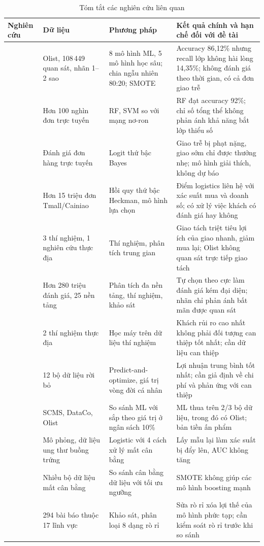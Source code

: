 \documentclass[12pt,a4paper]{report}
\begin{document}
\begin{table}[htbp]\centering\footnotesize
\caption{Tóm tắt các nghiên cứu liên quan}\label{tab:related}
\begin{tabular}{L{2.5cm}L{3.0cm}L{3.4cm}L{5.3cm}}
\toprule
Nghiên cứu & Dữ liệu & Phương pháp & Kết quả chính và hạn chế đối với đề tài \\
\midrule
\textcite{orman2026} & Olist, 108\,449 quan sát, nhãn 1--2 sao & 8 mô hình ML, 5 mô hình học sâu; chia ngẫu nhiên 80:20; SMOTE & Accuracy 86,12\% nhưng recall lớp không hài lòng 14,35\%; không đánh giá theo thời gian, có cả đơn giao trễ \\
\textcite{zaghloul2024} & Hơn 100 nghìn đơn trực tuyến & RF, SVM so với mạng nơ-ron & RF đạt accuracy 92\%; chỉ số tổng thể không phản ánh khả năng bắt lớp thiểu số \\
\textcite{ravula2023} & Đánh giá đơn hàng trực tuyến & Logit thứ bậc Bayes & Giao trễ bị phạt nặng, giao sớm chỉ được thưởng nhẹ; mô hình giải thích, không dự báo \\
\textcite{deshpande2023} & Hơn 15 triệu đơn Tmall/Cainiao & Hồi quy thứ bậc Heckman, mô hình lựa chọn & Điểm logistics liên hệ với xác suất mua và doanh số; có xử lý việc khách có đánh giá hay không \\
\textcite{brylla2022} & 3 thí nghiệm, 1 nghiên cứu thực địa & Thí nghiệm, phân tích trung gian & Giao tách triệt tiêu lợi ích của giao nhanh, giảm mua lại; Olist không quan sát trực tiếp giao tách \\
\textcite{schoenmueller2020} & Hơn 280 triệu đánh giá, 25 nền tảng & Phân tích đa nền tảng, thí nghiệm, khảo sát & Tự chọn theo cực làm đánh giá kém đại diện; nhãn chỉ phản ánh bất mãn được quan sát \\
\textcite{ascarza2018} & 2 thí nghiệm thực địa & Học máy trên dữ liệu thí nghiệm & Khách rủi ro cao nhất không phải đối tượng can thiệp tốt nhất; cần dữ liệu can thiệp \\
\textcite{gomezvargas2025} & 12 bộ dữ liệu rời bỏ & Predict-and-optimize, giá trị vòng đời cá nhân & Lợi nhuận trung bình tốt nhất; cần giả định về chi phí và phản ứng với can thiệp \\
\textcite{li2026valuesorting} & SCMS, DataCo, Olist & So sánh ML với sắp theo giá trị ở ngân sách 10\% & ML thua trên 2/3 bộ dữ liệu, trong đó có Olist; bản tiền ấn phẩm \\
\textcite{vandengoorbergh2022} & Mô phỏng, dữ liệu ung thư buồng trứng & Logistic với 4 cách xử lý mất cân bằng & Lấy mẫu lại làm xác suất bị đẩy lên, AUC không tăng \\
\textcite{elor2022smote} & Nhiều bộ dữ liệu mất cân bằng & So sánh cân bằng dữ liệu với tối ưu ngưỡng & SMOTE không giúp các mô hình boosting mạnh \\
\textcite{kapoor2023} & 294 bài báo thuộc 17 lĩnh vực & Khảo sát, phân loại 8 dạng rò rỉ & Sửa rò rỉ xóa lợi thế của mô hình phức tạp; cần kiểm soát rò rỉ trước khi so sánh \\
\bottomrule
\end{tabular}
\end{table}
\end{document}
